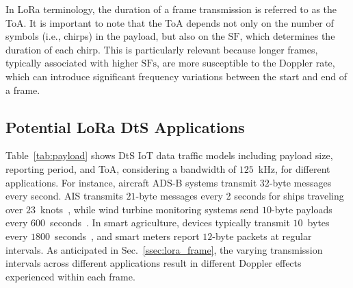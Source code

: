 \documentclass{IEEEtran}
\begin{document}
In \ac{LoRa} terminology, the duration of a frame transmission is referred to as the \ac{ToA}. It is important to note that the \ac{ToA} depends not only on the number of symbols (i.e., chirps) in the payload, but also on the $\mathrm{SF}$, which determines the duration of each chirp. This is particularly relevant because longer frames, typically associated with higher $\mathrm{SFs}$, are more susceptible to the Doppler rate, which can introduce significant frequency variations between the start and end of a frame.  


\subsection{Potential LoRa DtS Applications} 
\begin{table}
\caption{Potential satellite IoT applications and traffic models.}
\label{tab:payload}
\end{table}
Table~\ref{tab:payload} shows \ac{DtS} IoT data traffic models including payload size, reporting period, and \ac{ToA}, considering a bandwidth of $125$~kHz, for different applications. For instance, aircraft \ac{ADS-B} systems transmit $32$-byte messages every second. \ac{AIS} transmits $21$-byte messages every 2 seconds for ships traveling over $23$~knots~\cite{Asad23,Asad_ships}, while wind turbine monitoring systems send $10$-byte payloads every $600$~seconds~\cite{Ullah_Mikhaylov_Alves_22}. In smart agriculture, devices typically transmit $10$~bytes every $1800$~seconds~\cite{Lin}, and smart meters report $12$-byte packets at regular intervals. As anticipated in Sec.~\ref{ssec:lora_frame}, the varying transmission intervals across different applications result in different Doppler effects experienced within each frame.
\end{document}
